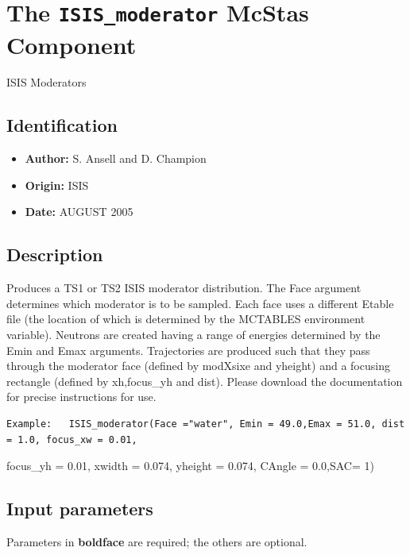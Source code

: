 \section{The \texttt{ISIS\_moderator} McStas Component}
ISIS Moderators

\subsection*{Identification}
\begin{itemize}
  \item \textbf{Author:} S. Ansell and D. Champion
  \item \textbf{Origin:} ISIS
  \item \textbf{Date:} AUGUST 2005
\end{itemize}

\subsection*{Description}
Produces a TS1 or TS2 ISIS moderator distribution. The Face argument determines which moderator is to be sampled. Each face uses a different Etable file (the location of which is determined by the MCTABLES environment variable). Neutrons are created having a range of energies determined by the Emin and Emax arguments. Trajectories are produced such that they pass through the moderator face (defined by modXsixe and yheight) and a focusing rectangle (defined by xh,focus\_yh and dist). Please download the documentation for precise instructions for use.

\begin{verbatim}
Example:   ISIS_moderator(Face ="water", Emin = 49.0,Emax = 51.0, dist = 1.0, focus_xw = 0.01,
\end{verbatim}

focus\_yh = 0.01, xwidth = 0.074, yheight = 0.074, CAngle = 0.0,SAC= 1)

\subsection*{Input parameters}
Parameters in \textbf{boldface} are required; the others are optional.

